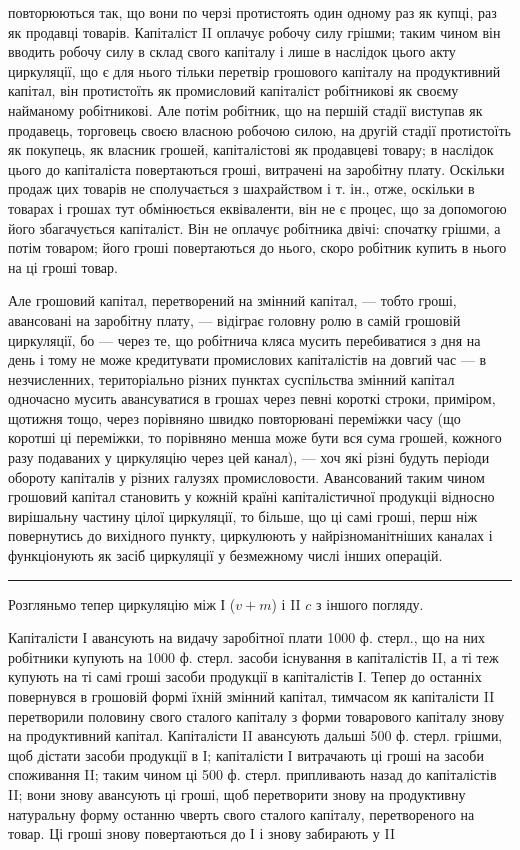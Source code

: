 \parcont{}  %
повторюються так, що вони по черзі протистоять один одному раз як
купці, раз як продавці товарів. Капіталіст II оплачує робочу силу грішми;
таким чином він вводить робочу силу в склад свого капіталу і лише
в наслідок цього акту циркуляції, що є для нього тільки перетвір грошового
капіталу на продуктивний капітал, він протистоїть як промисловий
капіталіст робітникові як своєму найманому робітникові. Але
потім робітник, що на першій стадії виступав як продавець, торговець
своєю власною робочою силою, на другій стадії протистоїть як покупець,
як власник грошей, капіталістові як продавцеві товару; в наслідок цього
до капіталіста повертаються гроші, витрачені на заробітну плату. Оскільки
продаж цих товарів не сполучається з шахрайством і т. ін., отже,
оскільки в товарах і грошах тут обмінюється еквіваленти, він не є процес,
що за допомогою його збагачується капіталіст. Він не оплачує
робітника двічі: спочатку грішми, а потім товаром; його гроші повертаються
до нього, скоро робітник купить в нього на ці гроші товар.

Але грошовий капітал, перетворений на змінний капітал, — тобто гроші,
авансовані на заробітну плату, — відіграє головну ролю в самій грошовій
циркуляції, бо — через те, що робітнича кляса мусить перебиватися з
дня на день і тому не може кредитувати промислових капіталістів на
довгий час — в незчисленних, територіально різних пунктах суспільства
змінний капітал одночасно мусить авансуватися в грошах через певні
короткі строки, приміром, щотижня тощо, через порівняно швидко
повторювані переміжки часу (що коротші ці переміжки, то порівняно
менша може бути вся сума грошей, кожного разу подаваних у
циркуляцію через цей канал), — хоч які різні будуть періоди обороту
капіталів у різних галузях промисловости. Авансований таким чином грошовий
капітал становить у кожній країні капіталістичної продукціі відносно
вирішальну частину цілої циркуляції, то більше, що ці самі гроші,
перш ніж повернутись до вихідного пункту, циркулюють у найрізноманітніших
каналах і функціонують як засіб циркуляції у безмежному числі
інших операцій.
\pfbreak
Розгляньмо тепер циркуляцію між І ($v + m$) і II $c$ з іншого погляду.

Капіталісти І авансують на видачу заробітної плати 1000 ф. стерл.,
що на них робітники купують на 1000 ф. стерл. засоби існування в капіталістів
II, а ті теж купують на ті самі гроші засоби продукції в капіталістів
І. Тепер до останніх повернувся в грошовій формі їхній змінний
капітал, тимчасом як капіталісти II перетворили половину свого сталого
капіталу з форми товарового капіталу знову на продуктивний капітал.
Капіталісти II авансують дальші 500 ф. стерл. грішми, щоб дістати засоби
продукції в І; капіталісти І витрачають ці гроші на засоби споживання
II; таким чином ці 500 ф. стерл. припливають назад до капіталістів II;
вони знову авансують ці гроші, щоб перетворити знову на продуктивну
натуральну форму останню чверть свого сталого капіталу, перетвореного
на товар. Ці гроші знову повертаються до І і знову забирають у II
\parbreak{}  %
